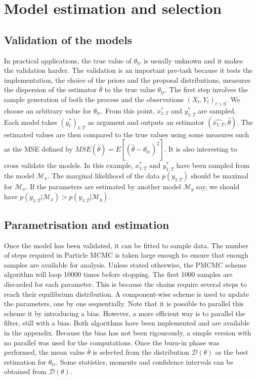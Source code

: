 \documentclass[11pt,a4,twosided,singlespacing,titlepagenumber=on]{scrreprt}
\numberwithin{equation}{chapter} %
\theoremstyle{remark}
\begin{document}
\chapter{Model estimation and selection}

\section{Validation of the models}

\noindent
In practical applications, the true value of $\theta_{tr}$ is usually unknown and it makes the validation harder. The validation is an important pre-task because it tests the implementation, the choice of the priors and the proposal distributions, measures the dispersion of the estimator $\hat{\theta}$ to the true value $\theta_{tr}$. The first step involves the sample generation of both the process and the observations $(X_t, Y_t)_{t > 0}$. We choose an arbitrary value for $\theta_{tr}$. From this point, $x^*_{1:T}$ and $y^*_{1:T}$ are sampled. Each model takes $(y_t^*)_{1:T}$ as argument and outputs an estimator $(\hat{x_{1:T}}, \hat{\theta})$. The estimated values are then compared to the true values using some measures such as the MSE defined by $MSE(\hat{\theta}) = E[ ( \hat{\theta} - \theta_{tr} )^2 ]$. It is also interesting to cross validate the models. In this example, $x^*_{1:T}$ and $y^*_{1:T}$ have been sampled from the model $\mathcal{M}_x$. The marginal likelihood of the data $p(y_{1:T})$ should be maximal for $\mathcal{M}_x$. If the parameters are estimated by another model $\mathcal{M}_y$ say, we should have $p(y_{1:T} | \mathcal{M}_x) > p(y_{1:T} | \mathcal{M}_y)$.


\section{Parametrisation and estimation}

Once the model has been validated, it can be fitted to sample data. The number of steps required in Particle MCMC is taken large enough to ensure that enough samples are available for analysis. Unless stated otherwise, the PMCMC scheme algorithm will loop 10000 times before stopping. The first 1000 samples are discarded for each parameter. This is because the chains require several steps to reach their equilibrium distribution. A component-wise scheme is used to update the parameters, one by one sequentially. Note that it is possible to parallel this scheme it by introducing a bias. However, a more efficient way is to parallel the filter, still with a bias. Both algorithms have been implemented and are available in the appendix. Because the bias has not been rigourously, a simple version with no parallel was used for the computations. Once the burn-in phase was performed, the mean value $\bar{\theta}$ is selected from the distribution $\mathcal{D}(\theta)$ as the best estimation for $\theta_{tr}$. Some statistics, moments and confidence intervals can be obtained from $\mathcal{D}(\theta)$.
\end{document}
